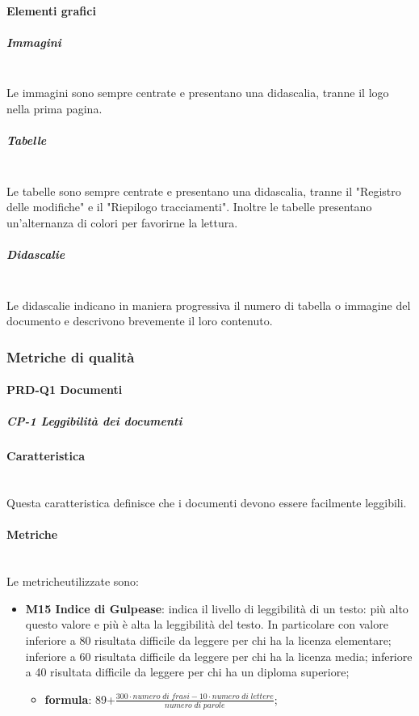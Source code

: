             \paragraph{Elementi grafici}
                \subparagraph{Immagini}\mbox{}\\ [1mm]
                    Le immagini sono sempre centrate e presentano una didascalia, tranne il logo nella prima pagina.
                \subparagraph{Tabelle}\mbox{}\\ [1mm]
                    Le tabelle sono sempre centrate e presentano una didascalia, tranne il "Registro delle modifiche" e il "Riepilogo tracciamenti".
                    Inoltre le tabelle presentano un'alternanza di colori per favorirne la lettura.
                \subparagraph{Didascalie}\mbox{}\\ [1mm]
                    Le didascalie indicano in maniera progressiva il numero di tabella o immagine del documento e descrivono brevemente il loro contenuto.

          \subsubsection{Metriche di qualità}
	          \paragraph{PRD-Q1 Documenti}
		          \subparagraph{CP-1 Leggibilità dei documenti}
		          \paragraph*{Caratteristica}\mbox{}\\ [1mm]
		          Questa caratteristica definisce che i documenti devono essere facilmente leggibili.
		          \paragraph*{Metriche}\mbox{}\\ [1mm]
		          Le metriche\glosp utilizzate sono:   
	          	  \begin{itemize}
		          	  	\item \textbf{M15 Indice di Gulpease}: indica il livello di leggibilità di un testo: più alto questo valore e più è alta la leggibilità del testo. In particolare con valore inferiore a 80 risultata difficile da leggere per chi ha la licenza elementare; inferiore a 60 risultata difficile da leggere per chi ha la licenza media; inferiore a 40 risultata difficile da leggere per chi ha un diploma superiore;
		          	  	\begin{itemize}
		          	  		\item[] \textbf{formula}: 89+$\frac{300\cdot numero \; di \; frasi-10\cdot numero \; di \; lettere}{numero \; di \; parole}$;
		          	  	\end{itemize}               
	          	  \end{itemize}
	         
